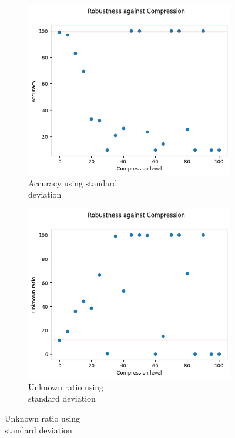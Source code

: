 \begin{figure}[h]
	\centering
	\begin{subfigure}{.33\textwidth}
		\centering
		\includegraphics[width=0.9\linewidth]{ImageFiles/EvalBNN/CO/VU/acc}
		\caption{Accuracy using standard \\ deviation}
		\label{fig:co_vu_acc}
	\end{subfigure}%
	\begin{subfigure}{.33\textwidth}
		\centering
		\includegraphics[width=0.9\linewidth]{ImageFiles/EvalBNN/CO/VU/unkn}
		\caption{Unknown ratio using \\ standard deviation}
		\label{fig:co_vu_unkn}
	\end{subfigure}%

\end{figure}

